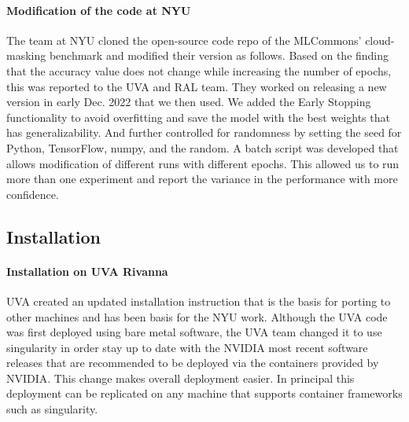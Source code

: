 \documentclass[sigplan,screen]{acmart}
\begin{document}
\paragraph{Modification of the code at NYU} The team at NYU cloned the open-source code \cite{www-mlcommons-science-github} repo of the MLCommons' cloud-masking benchmark and modified their version as follows. 
Based on the finding that the accuracy value does not change while increasing the number of epochs, this was reported to the UVA and RAL team. They worked on releasing a new version in early Dec. 2022 that we then used. We added the Early Stopping \cite{Caruana2000OverfittingIN} functionality to avoid overfitting and save the model with the best weights that has generalizability. And further controlled for randomness by setting the seed for Python, TensorFlow, numpy, and the random. A batch script was developed that allows modification of different runs with different epochs. This allowed us to run more than one experiment and report the variance in the performance with more confidence.


\subsection{Installation}
\label{sec:install}

\paragraph{Installation on UVA Rivanna} UVA created an updated installation instruction that is the basis for porting to other machines and has been basis for the NYU work. Although the UVA code was first deployed using bare metal software, the UVA team changed it to use singularity in order stay up to date with the NVIDIA most recent software releases that are recommended to be deployed via the containers provided by NVIDIA. This change makes overall deployment easier. In principal this deployment can be replicated on any machine that supports container frameworks such as singularity.
\end{document}
